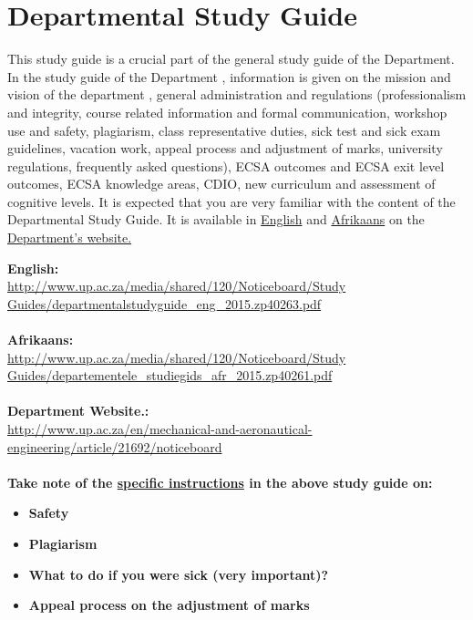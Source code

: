 \section{Departmental Study Guide} \label{sec:dep_study_guide}
    This study guide is a crucial part of the general study guide of the
    Department. In the study guide of the Department , information is given
    on the mission and vision of the department , general administration and
    regulations (professionalism and integrity, course related information
    and formal communication, workshop use and safety, plagiarism, class
    representative duties, sick test and sick exam guidelines, vacation work,
    appeal process and adjustment of marks, university regulations, frequently
    asked questions), ECSA outcomes and ECSA exit level outcomes, ECSA
    knowledge areas, CDIO, new curriculum and assessment of cognitive levels.
    It is expected that you are very familiar with the content of the
    Departmental Study Guide. It is available in
    \href{http://www.up.ac.za/media/shared/120/Noticeboard/Study Guides/departmentalstudyguide_eng_2015.zp40263.pdf}{English}
    and
    \href{http://www.up.ac.za/media/shared/120/Noticeboard/Study Guides/departementele_studiegids_afr_2015.zp40261.pdf}{Afrikaans}
    on the
    \href{http://www.up.ac.za/en/mechanical-and-aeronautical-engineering/article/21692/noticeboard}{Department’s website.}

    \noindent
    \textbf{English:} \\
    \url{http://www.up.ac.za/media/shared/120/Noticeboard/Study Guides/departmentalstudyguide_eng_2015.zp40263.pdf} \\~\\
    \textbf{Afrikaans:} \\
    \url{http://www.up.ac.za/media/shared/120/Noticeboard/Study Guides/departementele_studiegids_afr_2015.zp40261.pdf} \\~\\
    \textbf{Department Website.:} \\
    \url{http://www.up.ac.za/en/mechanical-and-aeronautical-engineering/article/21692/noticeboard} \\~\\


    \noindent
    \textbf{Take note of the \uline{specific instructions} in the above study guide on:}
    \begin{itemize}
        \item \textbf{Safety}
        \item \textbf{Plagiarism}
        \item \textbf{What to do if you were sick (very important)?}
        \item \textbf{Appeal process on the adjustment of marks}
    \end{itemize}
